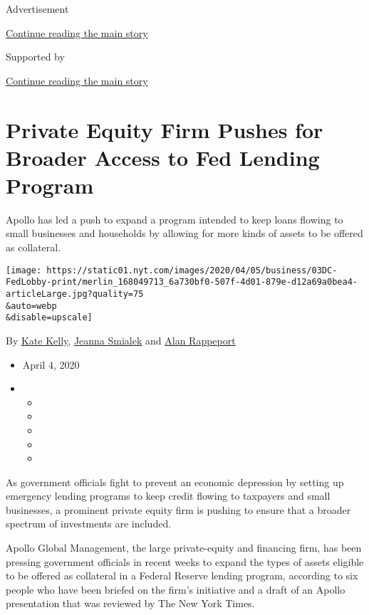 Advertisement

\protect\hyperlink{after-top}{Continue reading the main story}

Supported by

\protect\hyperlink{after-sponsor}{Continue reading the main story}

\hypertarget{private-equity-firm-pushes-for-broader-access-to-fed-lending-program}{%
\section{Private Equity Firm Pushes for Broader Access to Fed Lending
Program}\label{private-equity-firm-pushes-for-broader-access-to-fed-lending-program}}

Apollo has led a push to expand a program intended to keep loans flowing
to small businesses and households by allowing for more kinds of assets
to be offered as collateral.

\texttt{[image: https://static01.nyt.com/images/2020/04/05/business/03DC-FedLobby-print/merlin\_168049713\_6a730bf0-507f-4d01-879e-d12a69a0bea4-articleLarge.jpg?quality=75\\\&auto=webp\\\&disable=upscale]}

By \href{https://www.nytimes.com/by/kate-kelly}{Kate Kelly},
\href{https://www.nytimes.com/by/jeanna-smialek}{Jeanna Smialek} and
\href{https://www.nytimes.com/by/alan-rappeport}{Alan Rappeport}

\begin{itemize}
\item
  April 4, 2020
\item
  \begin{itemize}
  \item
  \item
  \item
  \item
  \item
  \end{itemize}
\end{itemize}

As government officials fight to prevent an economic depression by
setting up emergency lending programs to keep credit flowing to
taxpayers and small businesses, a prominent private equity firm is
pushing to ensure that a broader spectrum of investments are included.

Apollo Global Management, the large private-equity and financing firm,
has been pressing government officials in recent weeks to expand the
types of assets eligible to be offered as collateral in a Federal
Reserve lending program, according to six people who have been briefed
on the firm's initiative and a draft of an Apollo presentation that was
reviewed by The New York Times.

